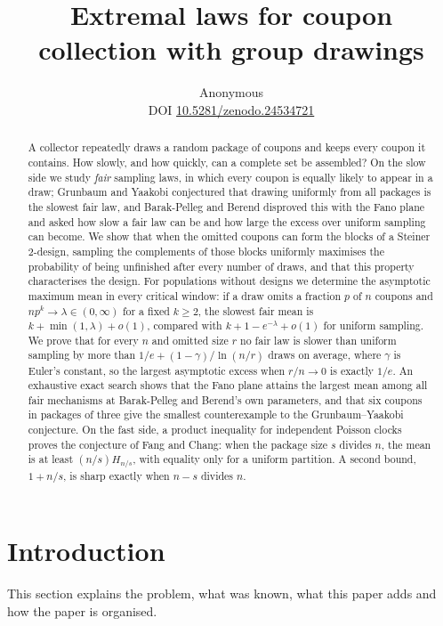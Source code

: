 \documentclass[11pt,a4paper]{article}
\title{Extremal laws for coupon collection with group drawings}
\author{Anonymous\\[3pt]{\small DOI \href{https://doi.org/10.5281/zenodo.24534721}{10.5281/zenodo.24534721}}}
\date{}
\theoremstyle{remark}
\begin{document}
\maketitle

\begin{abstract}
A collector repeatedly draws a random package of coupons and keeps every coupon it contains. How slowly, and how quickly, can a complete set be assembled? On the slow side we study \emph{fair} sampling laws, in which every coupon is equally likely to appear in a draw; Grunbaum and Yaakobi conjectured that drawing uniformly from all packages is the slowest fair law, and Barak-Pelleg and Berend disproved this with the Fano plane and asked how slow a fair law can be and how large the excess over uniform sampling can become. We show that when the omitted coupons can form the blocks of a Steiner $2$-design, sampling the complements of those blocks uniformly maximises the probability of being unfinished after every number of draws, and that this property characterises the design. For populations without designs we determine the asymptotic maximum mean in every critical window: if a draw omits a fraction $p$ of $n$ coupons and $np^k\to\lambda\in(0,\infty)$ for a fixed $k\ge2$, the slowest fair mean is $k+\min(1,\lambda)+o(1)$, compared with $k+1-e^{-\lambda}+o(1)$ for uniform sampling. We prove that for every $n$ and omitted size $r$ no fair law is slower than uniform sampling by more than $1/e+(1-\gamma)/\ln(n/r)$ draws on average, where $\gamma$ is Euler's constant, so the largest asymptotic excess when $r/n\to0$ is exactly $1/e$. An exhaustive exact search shows that the Fano plane attains the largest mean among all fair mechanisms at Barak-Pelleg and Berend's own parameters, and that six coupons in packages of three give the smallest counterexample to the Grunbaum--Yaakobi conjecture. On the fast side, a product inequality for independent Poisson clocks proves the conjecture of Fang and Chang: when the package size $s$ divides $n$, the mean is at least $(n/s)H_{n/s}$, with equality only for a uniform partition. A second bound, $1+n/s$, is sharp exactly when $n-s$ divides $n$.
\end{abstract}

\section{Introduction}
\label{sec:intro}
This section explains the problem, what was known, what this paper adds and how the paper is organised.
\end{document}
